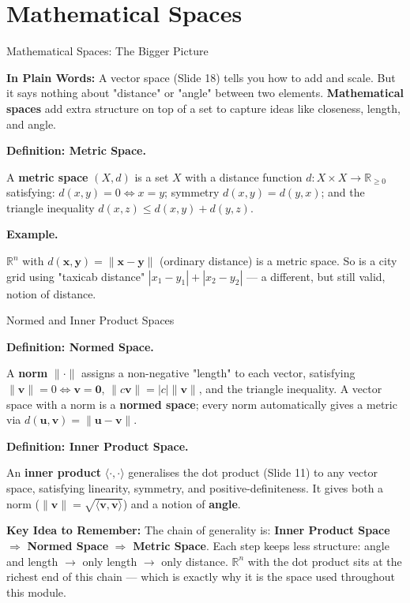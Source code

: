 \documentclass[9pt,aspectratio=169]{beamer}
\newcommand{\keyidea}[1]{%
\par\medskip\noindent\textbf{Key Idea to Remember:} #1\par\medskip}
\newcommand{\childex}[1]{%
\par\medskip\noindent\textbf{In Plain Words:} #1\par\medskip}
\begin{document}
\section{Mathematical Spaces}

\begin{frame}{Mathematical Spaces: The Bigger Picture}
\childex{A vector space (Slide 18) tells you how to add and scale. But it says nothing
about "distance" or "angle" between two elements. \textbf{Mathematical spaces} add extra
structure on top of a set to capture ideas like closeness, length, and angle.}

\par\noindent\textbf{Definition: Metric Space.}\par
A \textbf{metric space} $(X,d)$ is a set $X$ with a distance function $d:X\times X \to
\mathbb{R}_{\ge0}$ satisfying: $d(x,y)=0 \iff x=y$; symmetry $d(x,y)=d(y,x)$; and the
triangle inequality $d(x,z)\le d(x,y)+d(y,z)$.
\medskip


\par\noindent\textbf{Example.}\par
$\mathbb{R}^n$ with $d(\mathbf{x},\mathbf{y})=\|\mathbf{x}-\mathbf{y}\|$ (ordinary
distance) is a metric space. So is a city grid using "taxicab distance"
$|x_1-y_1|+|x_2-y_2|$ --- a different, but still valid, notion of distance.
\medskip

\end{frame}

\begin{frame}{Normed and Inner Product Spaces}
\par\noindent\textbf{Definition: Normed Space.}\par
A \textbf{norm} $\|\cdot\|$ assigns a non-negative "length" to each vector, satisfying
$\|\mathbf{v}\|=0\iff \mathbf{v}=\mathbf{0}$, $\|c\mathbf{v}\|=|c|\|\mathbf{v}\|$, and the
triangle inequality. A vector space with a norm is a \textbf{normed space}; every norm
automatically gives a metric via $d(\mathbf{u},\mathbf{v})=\|\mathbf{u}-\mathbf{v}\|$.
\medskip


\par\noindent\textbf{Definition: Inner Product Space.}\par
An \textbf{inner product} $\langle \cdot,\cdot\rangle$ generalises the dot product
(Slide 11) to any vector space, satisfying linearity, symmetry, and positive-definiteness.
It gives both a norm ($\|\mathbf{v}\|=\sqrt{\langle\mathbf{v},\mathbf{v}\rangle}$) and a
notion of \textbf{angle}.
\medskip


\keyidea{The chain of generality is: \textbf{Inner Product Space} $\Rightarrow$
\textbf{Normed Space} $\Rightarrow$ \textbf{Metric Space}. Each step keeps less structure:
angle and length $\to$ only length $\to$ only distance. $\mathbb{R}^n$ with the dot product
sits at the richest end of this chain --- which is exactly why it is the space used
throughout this module.}
\end{frame}
\end{document}
